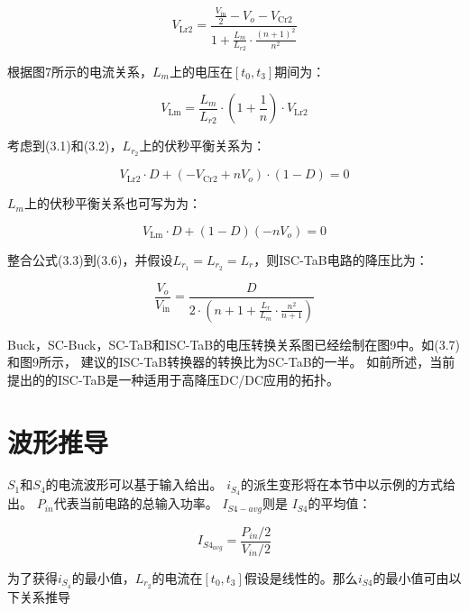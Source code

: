 \documentclass[12pt,a4paper]{report}
\begin{document}
\begin{equation}
    V_{\mathrm{Lr} 2}=\frac{\frac{V_{\mathrm{in}}}{2}-V_{o}-V_{\mathrm{Cr} 2}}{1+\frac{L_{m}}{L_{r 2}} \cdot \frac{(n+1)^{2}}{n^{2}}}
\end{equation}

根据图7所示的电流关系，$L_m$上的电压在$[t_0,t_3]$期间为：

\begin{equation}
    V_{\mathrm{Lm}}=\frac{L_{m}}{L_{r 2}} \cdot\left(1+\frac{1}{n}\right) \cdot V_{\mathrm{Lr} 2}
\end{equation}

考虑到(3.1)和(3.2)，$L_{r_2}$上的伏秒平衡关系为：

\begin{equation}
    V_{\mathrm{Lr} 2} \cdot D+\left(-V_{\mathrm{Cr} 2}+n V_{o}\right) \cdot(1-D)=0
\end{equation}

$L_{m}$上的伏秒平衡关系也可写为为：

\begin{equation}
    V_{\mathrm{Lm}} \cdot D+(1-D)\left(-n V_{o}\right)=0
\end{equation}

整合公式(3.3)到(3.6)，并假设$L_{r_1}=L_{r_2}=L_{r}$，则ISC-TaB电路的降压比为：

\begin{equation}
    \frac{V_{o}}{V_{\mathrm{in}}}=\frac{D}{2 \cdot\left(n+1+\frac{L_{r}}{L_{m}} \cdot \frac{n^{2}}{n+1}\right)}
\end{equation}

Buck，SC-Buck，SC-TaB和ISC-TaB的电压转换关系图已经绘制在图9中。如(3.7)和图9所示，
建议的ISC-TaB转换器的转换比为SC-TaB的一半。 如前所述，当前提出的的ISC-TaB是一种适用于高降压DC/DC应用的拓扑。

\section{波形推导}

$S_1$和$S_4$的电流波形可以基于输入给出。 $i_{S_4}$的派生变形将在本节中以示例的方式给出。 $P_{in}$代表当前电路的总输入功率。 $I_{S4-avg}$则是 $I_{S4}$的平均值：

\begin{equation}
    I_{S4_{avg}} = \frac{P_{in}/2}{V_{in}/2}
\end{equation}

为了获得$i_{S_4}$的最小值，$L_{r_2}$的电流在$[t_0,t_3]$假设是线性的。那么$i_{S4}$的最小值可由以下关系推导
\end{document}
